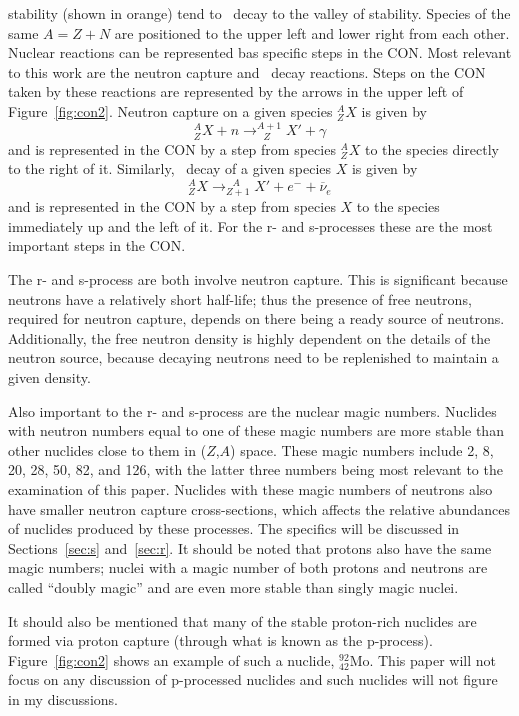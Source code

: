stability (shown in orange) tend to \bminus\ decay to the valley of
stability.  Species of the
same $A=Z+N$ are positioned to the upper left and lower right from
each other.  Nuclear reactions can be represented bas specific steps in
the CON.  Most relevant to this work are the neutron
capture and \bminus\ decay reactions.  Steps on the CON taken by these
reactions are represented by the arrows in the upper left of
Figure~\ref{fig:con2}.
  Neutron capture on a given
species $^{A}_ZX$ is given by
\begin{equation}
\label{eq:nc}
^{A}_ZX + n \rightarrow ^{A+1}_{\ \ \ Z}X' + \gamma
\end{equation}
and is represented in the CON by a step from species $^{A}_ZX$ to the
species directly to the right of it.  Similarly, \bminus\ decay of a
given species $X$ is given by
\begin{equation}
\label{eq:bd}
^{A}_ZX  \rightarrow ^{\ \ \ A}_{Z+1}X' + e^- + \overline{\nu}_e
\end{equation}
and is represented in the CON by a step from species $X$ to the
species immediately up and the left of it.  For the r- and s-processes
these are the most important steps in the CON.

The r- and s-process are both involve neutron capture.  This is
significant because neutrons have a relatively short half-life; thus
the presence of free neutrons, required for neutron capture, depends
on there being a ready source of neutrons.  Additionally, the free
neutron density is highly dependent on the details of the neutron
source, because decaying neutrons need to be replenished to maintain a
given density.

Also important to the r- and s-process are the nuclear magic numbers.
Nuclides with neutron numbers equal to one of these magic numbers are
more stable than other nuclides close to them in ($Z$,$A$) space.
These magic numbers include 2, 8, 20, 28, 50, 82, and 126, with the
latter three numbers being most relevant to the examination of this
paper.  Nuclides with these magic numbers of neutrons also have 
smaller neutron capture cross-sections, which affects the
relative abundances of nuclides produced by these processes.  The
specifics will be discussed in Sections~\ref{sec:s} and~\ref{sec:r}.
It should be noted that protons also have the same magic numbers;
nuclei with a magic number of both protons and neutrons are called
``doubly magic'' and are even more stable than singly magic nuclei.  

It should also be mentioned that many of the stable proton-rich
nuclides are formed via proton capture (through what is known as the p-process).  
Figure~\ref{fig:con2} shows an example of such a nuclide, $^{92}_{42}$Mo.  This paper will not focus
on any discussion of p-processed nuclides and such nuclides will not
figure in my discussions.

